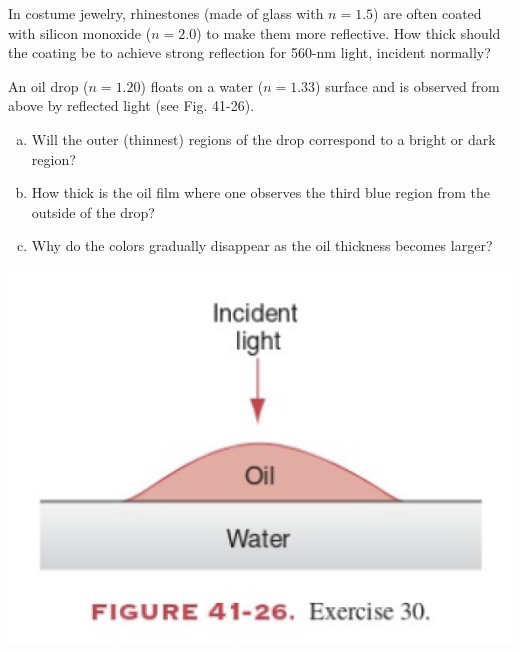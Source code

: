 \documentclass[12pt,letterpaper]{hmcpset}
\begin{document}
	\begin{problem}[41E24:]
		In costume jewelry, rhinestones (made of glass with $n = 1.5$) are often coated with silicon monoxide ($n = 2.0$) to make them more reflective.
		How thick should the coating be to achieve strong reflection for 560-nm light, incident normally?
	\end{problem}
	\clearpage



	\begin{problem}[41E30:]
		An oil drop ($n = 1.20$) floats on a water ($n = 1.33$) surface and is observed from above by reflected light (see Fig. 41-26).
		\begin{enumerate}[(a)]
			\item Will the outer (thinnest) regions of the drop correspond to a bright or dark region?
			\item How thick is the oil film where one observes the third blue region from the outside of the drop?
			\item Why do the colors gradually disappear as the oil thickness becomes larger?
		\end{enumerate}
		
		\centering\includegraphics[scale = 0.4]{Fig_41-26}
	\end{problem}
	\clearpage
\end{document}
